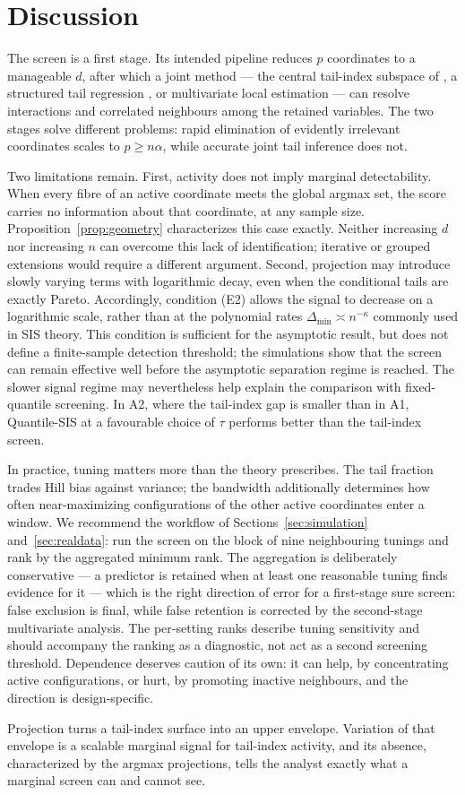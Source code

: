 \section{Discussion}\label{sec:discussion}

The screen is a first stage. Its intended
pipeline reduces $p$ coordinates to a manageable $d$, after which a joint
method --- the central tail-index subspace of \citet{gardesPodgorny2025}, a
structured tail regression \citep{wangTsai2009,sasakiTaoWang2026}, or
multivariate local estimation --- can resolve interactions and correlated
neighbours among the retained variables. The two stages solve different
problems: rapid elimination of evidently irrelevant coordinates scales to
$p \geq n\alpha$, while accurate joint tail inference does not.

Two limitations remain. First, activity does not imply marginal
detectability. When every fibre of an active coordinate meets the global
argmax set, the score carries no information about that coordinate, at any
sample size. Proposition~\ref{prop:geometry} characterizes this case
exactly. Neither increasing $d$ nor increasing $n$ can overcome this lack
of identification; iterative or grouped extensions would require a
different argument. Second, projection may introduce slowly varying terms with logarithmic
decay, even when the conditional tails are exactly Pareto. Accordingly,
condition (E2) allows the signal to decrease on a logarithmic scale, rather
than at the polynomial rates $\Delta_{\min}\asymp n^{-\kappa}$ commonly
used in SIS theory. This condition is sufficient for the asymptotic result, but does not define a finite-sample detection threshold; the simulations show that the screen can remain effective well before the asymptotic separation regime is reached. The slower signal regime may nevertheless help
explain the comparison with fixed-quantile screening. In A2, where the
tail-index gap is smaller than in A1, Quantile-SIS at a favourable choice
of $\tau$ performs better than the tail-index screen.


In practice, tuning matters more than the theory prescribes. The tail
fraction trades Hill bias against variance; the bandwidth additionally
determines how often near-maximizing configurations of the other active
coordinates enter a window. We recommend the workflow of
Sections~\ref{sec:simulation} and~\ref{sec:realdata}: run the screen on
the block of nine neighbouring tunings and rank by the aggregated
minimum rank. The aggregation is deliberately conservative --- a
predictor is retained when at least one reasonable tuning finds
evidence for it --- which is the right direction of error for a
first-stage sure screen: false exclusion is final, while false
retention is corrected by the second-stage multivariate analysis. The
per-setting ranks describe tuning sensitivity and should accompany the
ranking as a diagnostic, not act as a second screening threshold.
Dependence deserves caution of its own: it can help, by concentrating
active configurations, or hurt, by promoting inactive neighbours, and
the direction is design-specific.

Projection turns a tail-index surface into an upper envelope. Variation
of that envelope is a scalable marginal signal for tail-index activity,
and its absence, characterized by the argmax projections, tells the
analyst exactly what a marginal screen can and cannot see.
